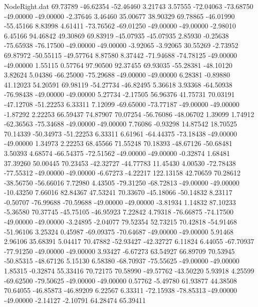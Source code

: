 \begin{filecontents}{NodeRight.dat}
  69.73789  -46.62354  -52.46460     3.21743    3.57555  -72.04063  -73.68750  -49.00000  -49.00000   -2.37646    3.46460   35.00677   38.90329
  69.78865  -46.01990  -55.45166     8.83998    4.61411  -73.76562  -69.01250  -49.00000  -49.00000   -2.98010    6.45166   94.46842   49.30869
  69.83919  -45.07935  -45.07935     2.85930   -0.25638  -75.65938  -76.17500  -49.00000  -49.00000   -3.92065   -3.92065   30.55269   -2.73952
  69.87972  -50.55115  -49.57764     8.87580    8.37442  -71.94688  -74.78125  -49.00000  -49.00000    1.55115    0.57764   97.90500   92.37455
  69.93035  -55.28381  -48.10120     3.82624    5.04386  -66.25000  -75.29688  -49.00000  -49.00000    6.28381   -0.89880   41.12023   54.20591
  69.98119  -54.27734  -46.82495     5.36618    3.93368  -64.50938  -76.98438  -49.00000  -49.00000    5.27734   -2.17505   56.96376   41.75731
  70.03191  -47.12708  -51.22253     6.33311    7.12099  -69.65000  -73.77187  -49.00000  -49.00000   -1.87292    2.22253   66.59437   74.87907
  70.07254  -56.76086  -48.06702     1.39099    1.74912  -62.36563  -75.34688  -49.00000  -49.00000    7.76086   -0.93298   14.87542   18.70525
  70.14339  -50.34973  -51.22253     6.33311    6.61961  -64.44375  -73.18438  -49.00000  -49.00000    1.34973    2.22253   68.45566   71.55248
  70.18393  -48.67126  -50.68481     3.50393    4.68574  -66.54375  -72.51562  -49.00000  -49.00000   -0.32874    1.68481   37.39260   50.00445
  70.23453  -42.32727  -44.77783    11.45430    4.00530  -72.78438  -77.55312  -49.00000  -49.00000   -6.67273   -4.22217  122.13158   42.70659
  70.28612  -38.56750  -56.66016     7.72980    4.43505  -79.31250  -68.72813  -49.00000  -49.00000  -10.43250    7.66016   82.84367   47.53241
  70.33670  -45.18066  -50.14832     8.23117   -0.50707  -76.99688  -70.59688  -49.00000  -49.00000   -3.81934    1.14832   87.10233   -5.36580
  70.37745  -45.75105  -46.95923     7.22842    4.79318  -76.66875  -74.17500  -49.00000  -49.00000   -3.24895   -2.04077   79.52354   52.73215
  70.42818  -54.91468  -51.96106     3.25324    0.45987  -69.09375  -70.64687  -49.00000  -49.00000    5.91468    2.96106   35.68391    5.04417
  70.47882  -52.93427  -42.32727     6.11824    6.44055  -67.70937  -77.91250  -49.00000  -49.00000    3.93427   -6.67273   63.54927   66.89709
  70.53945  -50.85315  -48.67126     5.15130    6.58380  -68.70937  -75.55625  -49.00000  -49.00000    1.85315   -0.32874   55.33416   70.72175
  70.58990  -49.57762  -43.50220     5.93918    4.25599  -69.62500  -79.50625  -49.00000  -49.00000    0.57762   -5.49780   61.93877   44.38508
  70.64055  -46.85873  -46.89209     6.22567    6.33311  -72.15938  -78.85313  -49.00000  -49.00000   -2.14127   -2.10791   64.28474   65.39411

\end{filecontents}
